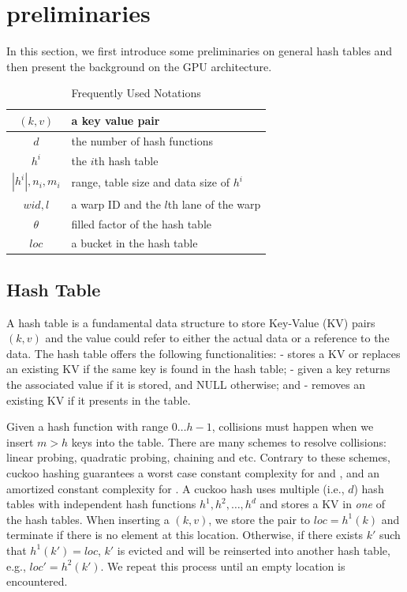 \section{preliminaries}\label{sec:pre}
In this section, we first introduce some preliminaries on general hash tables and then present the background on the GPU architecture. 

\begin{table}
	\centering
	\caption{Frequently Used Notations}
	\label{tbl:stat:datasets}
	\begin{tabular}{|c|l|}
		\hline
		$(k,v)$ & a key value pair \\ \hline
		$d$		& the number of hash functions \\ \hline
		$h^i$	& the $i$th hash table \\ \hline
		$|h^i|,n_i,m_i$	& range, table size and data size of $h^i$ \\ \hline
		$wid,l$	& a warp ID and the $l$th lane of the warp \\ \hline
		$\theta$& filled factor of the hash table \\ \hline
		$loc$	& a bucket in the hash table \\ \hline
	\end{tabular}
\end{table}

\subsection{Hash Table}
A hash table is a fundamental data structure to store Key-Value (KV) pairs $(k,v)$ and the value could refer to either the actual data or a reference to the data.
The hash table offers the following functionalities:  - stores a KV or replaces an existing KV if the same key is found in the hash table;  - given a key returns the associated value if it is stored, and NULL otherwise; and  - removes an existing KV if it presents in the table.  

Given a hash function with range $0 \ldots h-1$, collisions must happen when we insert $m>h$ keys into the table. There are many schemes to resolve collisions: linear probing, quadratic probing, chaining and etc. Contrary to these schemes, cuckoo hashing \cite{pagh2004cuckoo} guarantees a worst case constant complexity for  and ,  and an amortized constant complexity for . A cuckoo hash uses multiple (i.e., $d$) hash tables with independent hash functions $h^1,h^2,\ldots,h^d$ and stores a KV in \emph{one} of the hash tables. When inserting a $(k,v)$, we store the pair to $loc=h^1(k)$ and terminate if there is no element at this location. Otherwise, if there exists $k'$ such that $h^1(k')=loc$, $k'$ is evicted and will be reinserted into another hash table, e.g., $loc'=h^2(k')$.
We repeat this process until an empty location is encountered.

